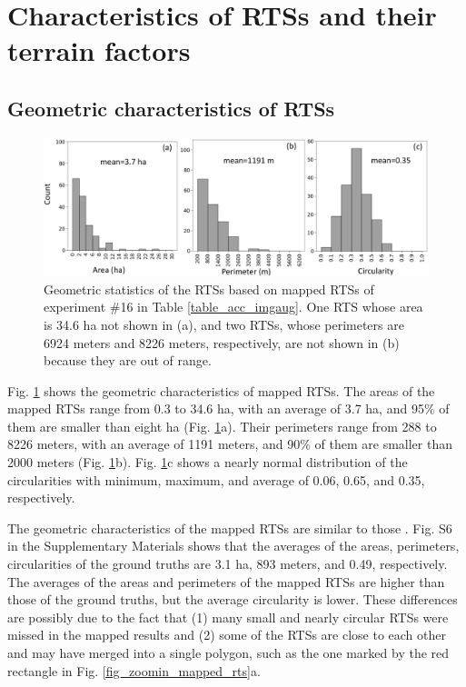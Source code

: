 \documentclass[authoryear,preprint,review,12pt]{elsarticle}
\begin{document}
\section{Characteristics of RTSs and their terrain factors}
\label{sec_spatial_terrain}


\subsection{Geometric characteristics of RTSs}
\label{subsec_geo_charac}

\begin{figure}
	\centering
	\includegraphics[width=14cm]{figures/geometric_var_mapped_trim.jpg}
	\caption{Geometric statistics of the RTSs based on mapped RTSs of experiment \#16 in Table \ref{table_acc_imgaug}. One RTS whose area is 34.6 ha not shown in (a), and two RTSs, whose perimeters are 6924 meters and 8226 meters, respectively, are not shown in (b) because they are out of range. }
	\label{fig_geometric_statistics}
\end{figure}


Fig. \ref{fig_geometric_statistics} shows the geometric characteristics of mapped RTSs.  The areas of the mapped RTSs range from 0.3 to 34.6 ha, with an average of 3.7 ha, and 95\% of them are smaller than eight ha (Fig. \ref{fig_geometric_statistics}a). Their perimeters range from 288 to 8226 meters, with an average of 1191 meters, and 90\% of them are smaller than 2000 meters  (Fig. \ref{fig_geometric_statistics}b). Fig. \ref{fig_geometric_statistics}c shows a nearly normal distribution of the circularities with minimum, maximum, and average of 0.06, 0.65, and 0.35, respectively. 

The geometric characteristics of the mapped RTSs are similar to those . Fig. S6 in the Supplementary Materials shows that the averages of the areas, perimeters, circularities of the ground truths 
 are 3.1 ha, 893 meters, and 0.49, respectively. The averages of the areas and perimeters of the mapped RTSs are higher than those of the ground truths, but the average circularity is lower. These differences are possibly due to the fact that (1) many small and nearly circular RTSs were missed in the mapped results and (2) some of the RTSs are close to each other and may have merged into a single polygon, such as the one marked by the red rectangle in Fig. \ref{fig_zoomin_mapped_rts}a.  
\end{document}
